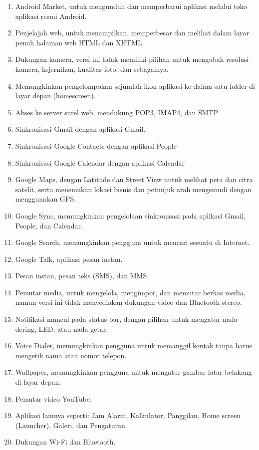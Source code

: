 \begin{enumerate}
\begin{enumerate}
\item Android Market, untuk mengunduh dan memperbarui aplikasi melalui toko aplikasi resmi Android.
\item Penjelajah web, untuk menampilkan, memperbesar dan melihat dalam layar penuh halaman web HTML dan XHTML.
\item Dukungan kamera, versi ini tidak memiliki pilihan untuk mengubah resolusi kamera, kejernihan, kualitas foto, dan sebagainya.
\item Memungkinkan pengelompokan sejumlah ikon aplikasi ke dalam satu folder di layar depan (homescreen).
\item Akses ke server surel web, mendukung POP3, IMAP4, dan SMTP
\item Sinkronisasi Gmail dengan aplikasi Gmail.
\item Sinkronisasi Google Contacts dengan aplikasi People
\item Sinkronisasi Google Calendar dengan aplikasi Calendar
\item Google Maps, dengan Latitude dan Street View untuk melihat peta dan citra satelit, serta menemukan lokasi bisnis dan petunjuk arah mengemudi dengan menggunakan GPS.
\item Google Sync, memungkinkan pengelolaan sinkronisasi pada aplikasi Gmail, People, dan Calendar.
\item Google Search, memungkinkan pengguna untuk mencari sesuatu di Internet.
\item Google Talk, aplikasi pesan instan.
\item Pesan instan, pesan teks (SMS), dan MMS.
\item Pemutar media, untuk mengelola, mengimpor, dan memutar berkas media, namun versi ini tidak menyediakan dukungan video dan Bluetooth stereo.
\item Notifikasi muncul pada status bar, dengan pilihan untuk mengatur nada dering, LED, atau nada getar.
\item Voice Dialer, memungkinkan pengguna untuk memanggil kontak tanpa harus mengetik nama atau nomor telepon.
\item Wallpaper, memungkinkan pengguna untuk mengatur gambar latar belakang di layar depan.
\item Pemutar video YouTube.
\item Aplikasi lainnya seperti: Jam Alarm, Kalkulator, Panggilan, Home screen (Launcher), Galeri, dan Pengaturan.
\item Dukungan Wi-Fi dan Bluetooth.
\end{enumerate}


\end{enumerate}
